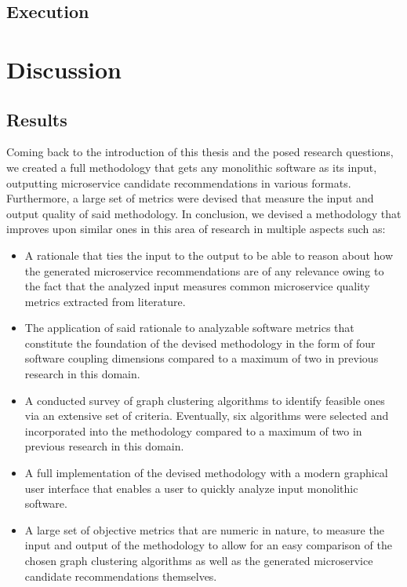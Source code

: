 \documentclass[12pt,a4paper]{report}
\begin{document}
\section{Execution} \label{sect:experiment-execution}






\chapter{Discussion} \label{chap:discussion}

\section{Results}

Coming back to the introduction of this thesis and the posed research questions,
we created a full methodology that gets any monolithic software as its input,
outputting microservice candidate recommendations in various formats.
Furthermore, a large set of metrics were devised that measure the input and
output quality of said methodology.
In conclusion, we devised a methodology that improves upon similar ones in
this area of research in multiple aspects such as:

\begin{itemize}
    \item A rationale that ties the input to the output to be able to reason
    about how the generated microservice recommendations are of any relevance
    owing to the fact that the analyzed input measures common microservice
    quality metrics extracted from literature.
    \item The application of said rationale to analyzable software metrics
    that constitute the foundation of the devised methodology in the form
    of four software coupling dimensions compared to a maximum
    of two in previous research in this domain.
    \item A conducted survey of graph clustering algorithms to identify feasible
    ones via an extensive set of criteria. Eventually, six algorithms were
    selected and incorporated into the methodology compared to a maximum
    of two in previous research in this domain.
    \item A full implementation of the devised methodology with a modern
    graphical user interface that enables a user to quickly analyze input
    monolithic software.
    \item A large set of objective metrics that are numeric in nature,
    to measure the input and output of the methodology to allow for an
    easy comparison of the chosen graph clustering algorithms as well as
    the generated microservice candidate recommendations themselves.
\end{itemize}
\end{document}
